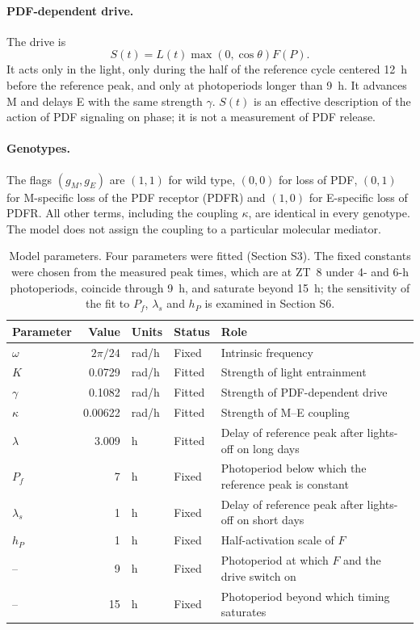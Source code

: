 \documentclass[10pt,a4paper]{article}
\begin{document}
\paragraph{PDF-dependent drive.}
The drive is
\begin{equation}
 S(t)=L(t)\max(0,\cos\theta)F(P).\label{eq:drive}
\end{equation}
It acts only in the light, only during the half of the reference cycle
centered 12~h before the reference peak, and only at photoperiods longer
than 9~h. It advances M and delays E with the same strength $\gamma$.
$S(t)$ is an effective description of the action of PDF signaling on
phase; it is not a measurement of PDF release.

\paragraph{Genotypes.}
The flags $(g_M,g_E)$ are $(1,1)$ for wild type, $(0,0)$ for loss of PDF,
$(0,1)$ for M-specific loss of the PDF receptor (PDFR) and $(1,0)$ for
E-specific loss of PDFR. All other terms, including the coupling $\kappa$,
are identical in every genotype. The model does not assign the coupling
to a particular molecular mediator.

\begin{table}[!htb]
\centering\small
\begin{tabularx}{\textwidth}{lrllY}
\toprule
Parameter & Value & Units & Status & Role\\
\midrule
$\omega$ & $2\pi/24$ & rad/h & Fixed & Intrinsic frequency\\
$K$ & 0.0729 & rad/h & Fitted & Strength of light entrainment\\
$\gamma$ & 0.1082 & rad/h & Fitted & Strength of PDF-dependent drive\\
$\kappa$ & 0.00622 & rad/h & Fitted & Strength of M--E coupling\\
$\lambda$ & 3.009 & h & Fitted & Delay of reference peak after lights-off on long days\\
$P_f$ & 7 & h & Fixed & Photoperiod below which the reference peak is constant\\
$\lambda_s$ & 1 & h & Fixed & Delay of reference peak after lights-off on short days\\
$h_P$ & 1 & h & Fixed & Half-activation scale of $F$\\
-- & 9 & h & Fixed & Photoperiod at which $F$ and the drive switch on\\
-- & 15 & h & Fixed & Photoperiod beyond which timing saturates\\
\bottomrule
\end{tabularx}
\caption{Model parameters. Four parameters were fitted (Section S3). The
fixed constants were chosen from the measured peak times, which are at
ZT~8 under 4- and 6-h photoperiods, coincide through 9~h, and saturate
beyond 15~h; the sensitivity of the fit to $P_f$, $\lambda_s$ and $h_P$
is examined in Section S6.}
\label{tab:parameters}
\end{table}
\end{document}
